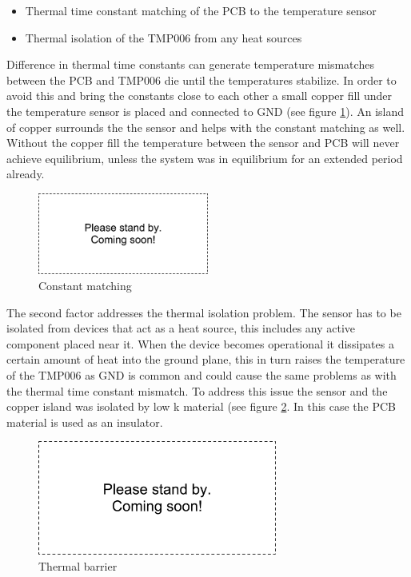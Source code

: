 \begin{itemize}
\item Thermal time constant matching of the PCB to the temperature sensor
\item Thermal isolation of the TMP006 from any heat sources
\end{itemize}

Difference in thermal time constants can generate temperature mismatches between the PCB and TMP006 die until the temperatures stabilize. In order to avoid this and bring the constants close to each other a small copper fill under the temperature sensor is placed and connected to GND (see figure \ref{fig:constant_matching}). An island of copper surrounds the the sensor and helps with the constant matching as well. Without the copper fill the temperature between the sensor and PCB will never achieve equilibrium, unless the system was in equilibrium for an extended period already. 

\begin{figure}
\centering
\includegraphics[width=0.5\textwidth]{Images/dummy}
\caption{Constant matching}
\label{fig:constant_matching}
\end{figure}

The second factor addresses the thermal isolation problem. The sensor has to be isolated from devices that act as a heat source, this includes any active component placed near it. When the device becomes operational it dissipates a certain amount of heat into the ground plane, this in turn raises the temperature of the TMP006 as GND is common and could cause the same problems as with the thermal time constant mismatch. To address this issue the sensor and the copper island was isolated by low k material (see figure \ref{fig:thermal_barrier}. In this case the PCB material is used as an insulator.

\begin{figure}
\centering
\includegraphics[width=0.7\textwidth]{Images/dummy}
\caption{Thermal barrier}
\label{fig:thermal_barrier}
\end{figure}

